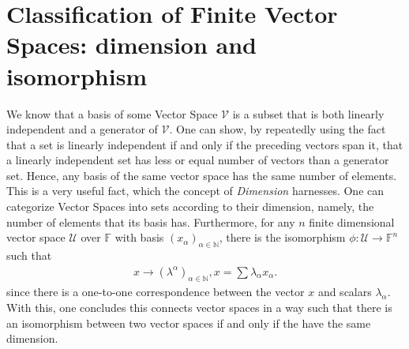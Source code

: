 \documentclass[12pt]{article}
\newcommand{\N}{\mathbb{N}}
\begin{document}
\section{Classification of Finite Vector Spaces: dimension and isomorphism}
We know that a basis of some Vector Space $\mathcal{V}$ is a subset that is both linearly independent and a generator of $\mathcal{V}$. One can show, by repeatedly using the fact that a set is linearly independent if and only if the preceding vectors span it, that a linearly independent set has less or equal number of vectors than a generator set. Hence, any basis of the same vector space has the same number of elements. \\
This is a very useful fact, which the concept of \textit{Dimension} harnesses. One can categorize Vector Spaces into sets according to their dimension, namely, the number of elements that its basis has. Furthermore, for any $n$ finite dimensional vector space $\mathcal{U}$ over $\mathbb{F}$ with basis $\left(x_{\alpha} \right)_{\alpha\in \N}$, there is the isomorphism $\phi: \mathcal{U} \to \mathbb{F}^{n}$ such that
\begin{align*}
  x \to (\lambda^{\alpha})_{\alpha\in\N}, x=\sum\lambda_{\alpha}x_{\alpha}.
\end{align*}
since there is a one-to-one correspondence between the vector $x$ and scalars $\lambda_{\alpha}$. With this, one concludes this connects vector spaces in a way such that there is an isomorphism between two vector spaces if and only if the have the same dimension. 
\end{document}
